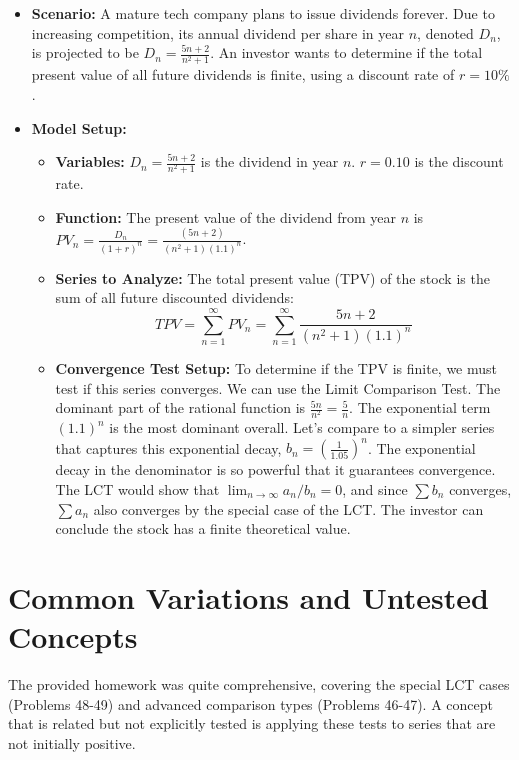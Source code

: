 \documentclass{article}
\begin{document}
\begin{itemize}
    \item \textbf{Scenario:} A mature tech company plans to issue dividends forever. Due to increasing competition, its annual dividend per share in year \(n\), denoted \(D_n\), is projected to be \( D_n = \frac{5n+2}{n^2+1} \). An investor wants to determine if the total present value of all future dividends is finite, using a discount rate of \(r=10\%\).
    \item \textbf{Model Setup:}
        \begin{itemize}
            \item \textbf{Variables:} \(D_n = \frac{5n+2}{n^2+1}\) is the dividend in year \(n\). \(r = 0.10\) is the discount rate.
            \item \textbf{Function:} The present value of the dividend from year \(n\) is \(PV_n = \frac{D_n}{(1+r)^n} = \frac{(5n+2)}{(n^2+1)(1.1)^n}\).
            \item \textbf{Series to Analyze:} The total present value (TPV) of the stock is the sum of all future discounted dividends:
            \[ TPV = \sum_{n=1}^{\infty} PV_n = \sum_{n=1}^{\infty} \frac{5n+2}{(n^2+1)(1.1)^n} \]
            \item \textbf{Convergence Test Setup:} To determine if the TPV is finite, we must test if this series converges. We can use the Limit Comparison Test. The dominant part of the rational function is \(\frac{5n}{n^2} = \frac{5}{n}\). The exponential term \((1.1)^n\) is the most dominant overall. Let's compare to a simpler series that captures this exponential decay, \(b_n = (\frac{1}{1.05})^n\). The exponential decay in the denominator is so powerful that it guarantees convergence. The LCT would show that \(\lim_{n \to \infty} a_n/b_n = 0\), and since \(\sum b_n\) converges, \(\sum a_n\) also converges by the special case of the LCT. The investor can conclude the stock has a finite theoretical value.
        \end{itemize}
\end{itemize}

\section{Common Variations and Untested Concepts}
The provided homework was quite comprehensive, covering the special LCT cases (Problems 48-49) and advanced comparison types (Problems 46-47). A concept that is related but not explicitly tested is applying these tests to series that are not initially positive.
\end{document}
